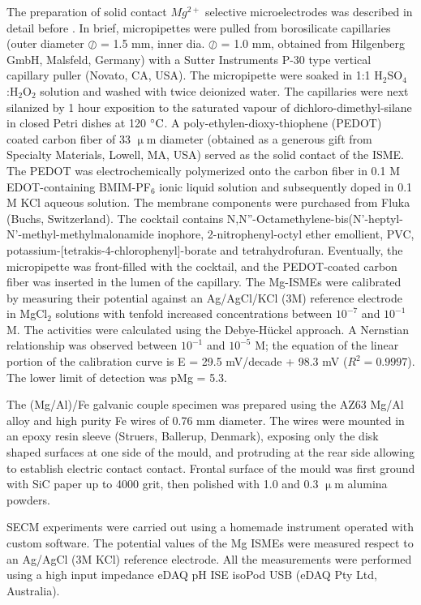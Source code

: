 \documentclass[3p]{elsarticle}
\begin{document}
The preparation of solid contact $Mg^{2+}$ selective microelectrodes was described in detail before \cite{overmg3}. In brief, micropipettes were pulled from borosilicate capillaries (outer diameter $\oslash$ = 1.5 mm, inner dia. $\oslash$ = 1.0 mm, obtained from Hilgenberg GmbH, Malsfeld, Germany) with a Sutter Instruments P-30 type vertical capillary puller (Novato, CA, USA). The micropipette were soaked in 1:1 H$_2$SO$_4$:H$_2$O$_2$ solution and washed with twice deionized water. The capillaries were next silanized by 1 hour exposition to the saturated vapour of dichloro-dimethyl-silane in closed Petri dishes at 120 $\celsius$. A poly-ethylen-dioxy-thiophene (PEDOT) coated carbon fiber of 33 $\upmu$m diameter (obtained as a generous gift from Specialty Materials, Lowell, MA, USA) served as the solid contact of the ISME. The PEDOT was electrochemically polymerized onto the carbon fiber in 0.1 M EDOT-containing BMIM-PF$_6$ ionic liquid solution and subsequently doped in 0.1 M KCl aqueous solution. The membrane components were purchased from Fluka (Buchs, Switzerland). The cocktail contains N,N''-Octamethylene-bis(N'-heptyl-N'-methyl-methylmalonamide inophore, 2-nitrophenyl-octyl ether emollient, PVC, potassium-[tetrakis-4-chlorophenyl]-borate and tetrahydrofuran. Eventually, the micropipette was front-filled with the cocktail, and the PEDOT-coated carbon fiber was inserted in the lumen of the capillary.
The Mg-ISMEs were calibrated by measuring their potential against an Ag/AgCl/KCl (3M) reference electrode in MgCl$_2$ solutions with tenfold increased concentrations between $10^{-7}$ and $10^{-1}$ M. The activities were calculated using the Debye-Hückel approach. A Nernstian relationship was observed between $10^{-1}$ and $10^{-5}$ M; the equation of the linear portion of the calibration curve is E = 29.5 mV/decade + 98.3 mV ($R^2=0.9997$). The lower limit of detection was pMg = 5.3.

The (Mg/Al)/Fe galvanic couple specimen was prepared using the AZ63 Mg/Al alloy and high purity Fe wires of 0.76 mm diameter. The wires were mounted in an epoxy resin sleeve (Struers, Ballerup, Denmark), exposing only the disk shaped surfaces at one side of the mould, and protruding at the rear side allowing to establish electric contact contact. Frontal surface of the mould was first ground with SiC paper up to 4000 grit, then polished with 1.0 and 0.3 $\upmu$m alumina powders.

SECM experiments were carried out using a homemade instrument operated with custom software. The potential values of the Mg ISMEs were measured respect to an Ag/AgCl (3M KCl) reference electrode. All the measurements were performed using a high input impedance eDAQ pH ISE isoPod USB (eDAQ Pty Ltd, Australia).
\end{document}

